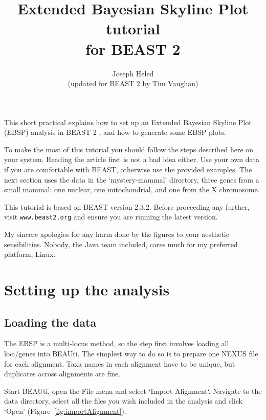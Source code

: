 \documentclass[a4paper,11pt]{article}
\title{Extended Bayesian Skyline Plot tutorial\\for BEAST 2}
\author{Joseph Heled\\(updated for BEAST 2 by Tim Vaughan)}
\date{}
\begin{document}
\maketitle

This short practical explains how to set up an Extended Bayesian Skyline Plot
(EBSP) analysis in BEAST 2 \citep{Bouckaert2014}, and how to generate some EBSP
plots.

To make the most of this tutorial you should follow the steps described here on
your system. Reading the article \citep{Heled2008} first is not a bad idea
either. Use your own data if you are comfortable with BEAST, otherwise use the
provided examples.  The next section uses the data in the `mystery-mammal'
directory, three genes from a small mammal: one nuclear, one mitochondrial, and
one from the X chromosome.

This tutorial is based on BEAST version 2.3.2. Before proceeding any further,
visit \texttt{www.beast2.org} and ensure you are running the latest version.

My sincere apologies for any harm done by the figures to your aesthetic
sensibilities. Nobody, the Java team included, cares much for my preferred
platform, Linux.

\section{Setting up the analysis}

\subsection{Loading the data}

The EBSP is a multi-locus method, so the step first involves loading all
loci/genes into BEAUti. The simplest way to do so is to prepare one NEXUS file
for each alignment. Taxa names in each alignment have to be unique, but
duplicates across alignments are fine.

Start BEAUti, open the File menu and select `Import Alignment`.  Navigate to
the data directory, select all the files you wish included in the analysis and
click `Open' (Figure~\ref{fig:importAlignment}).
\end{document}
